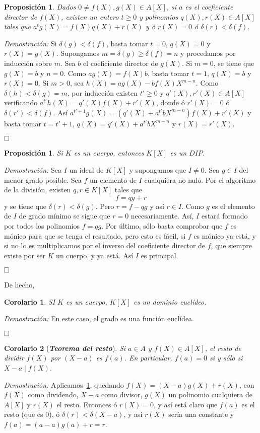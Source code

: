 \documentclass[12pt]{article}
\newtheorem{proposition}[theorem]{Proposición}
\newtheorem{corolario}{Corolario}[theorem]
\begin{document}
\begin{proposition}\label{eq:divPol} Dados $0 \neq f(X), g(X) \in A[X]$, si $a$ es el coeficiente director de $f(X)$, existen un entero $t \geq 0 $ y polinomios $q(X), r(X) \in A[X]$ tales que $a^tg(X) = f(X)q(X)+r(X)$ y ó $r(X) = 0$ ó $\delta (r) < \delta (f)$.
\end{proposition}
\emph{Demostración: }Si $\delta (g) < \delta (f)$,  basta tomar $t = 0$, $q(X) = 0$ y $r(X) = g(X)$. Supongamos $m = \delta(g) \geq \delta(f) = n$ y procedamos por inducción sobre $m$. Sea $b$ el coeficiente director de $g(X)$. Si $m = 0$, se tiene que $g(X) = b$ y $n = 0$. Como $ag(X)=f(X)b$, basta tomar $t=1$, $q(X)=b$ y $r(X)=0$. Si $m >0$, sea $h(X)=ag(X)-bf(X)X^{m-n}$. Como $\delta(h) < \delta(g)=m$, por inducción existen $t'\geq 0$ y $q'(X), r'(X) \in A[X]$ verificando $a^{t'}h(X) = q'(X)f(X) + r'(X)$, donde ó $r'(X) = 0$ ó $\delta(r') < \delta(f)$. Así $a^{t'+1}g(X) = (q'(X)+a^{t'}bX^{m-n})f(X)+r'(X)$ y basta tomar $t = t'+1$, $q(X) = q'(X) + a^{t'}bX^{m-n}$ y $r(X) = r'(X)$.

$\hfill \square$

\begin{proposition}Si $K$ es un cuerpo, entonces $K[X]$ es un $DIP$.
\end{proposition}
\emph{Demostración: }Sea $I$ un ideal de $K[X]$ y supongamos que $I \neq 0$. Sea $g \in I$ del menor grado posible. Sea $f$ un elemento de $I$ cualquiera no nulo. Por el algoritmo de la división, existen $q,r \in K[X]$ tales que $$f=qg+r$$ y se tiene que $\delta(r) < \delta(g)$. Pero $r = f-qg$ y así $r \in I$. Como $g$ es el elemento de $I$ de grado mínimo se sigue que $r=0$ necesariamente. Así, $I$ estará formado por todos los polinomios $f = qg$. Por último, sólo basta comprobar que $f$ es mónico para que se tenga el resultado, pero esto es fácil, si $f$ es mónico ya está, y si no lo es multiplicamos por el inverso del coeficiente director de $f$, que siempre existe por ser $K$ un cuerpo, y ya está. Así $I$ es principal.

$\hfill \square$

De hecho,

\begin{corolario}SI $K$ es un cuerpo, $K[X]$ es un dominio euclídeo.
\end{corolario}
\emph{Demostración: }En este caso, el grado es una función euclídea.

$\hfill \square$

\begin{corolario}[\textbf{\textit{Teorema del resto}}] Si $a \in A$ y $f(X) \in A[X]$, el resto de dividir $f(X)$ por $(X-a)$ es $f(a)$. En particular, $f(a) = 0$ si y sólo si $X-a \mid f(X)$.
\end{corolario}
\emph{Demostración: }Aplicamos~\ref{eq:divPol}, quedando $f(X)= (X-a)g(X)+r(X)$, con $f(X)$ como dividendo, $X-a$ como divisor, $g(X)$ un polinomio cualquiera de $A[X]$ y $r(X)$ el resto. Entonces ó $r(X)=0$, y así está claro que $f(a)$ es el resto (que es $0$), ó $\delta(r) < \delta(X-a)$, y así $r(X)$ sería una constante y $f(a) = (a-a)g(a) + r = r$.
\end{document}
